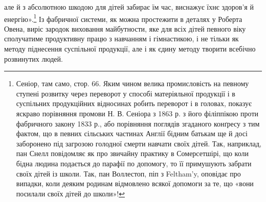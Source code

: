 але й з абсолютною шкодою для дітей забирає їм час, виснажує
їхнє здоров’я й енергію».\footnote{
Сеніор, там само, стор. 66. Яким чином велика промисловість на
певному ступені розвитку через переворот у способі матеріяльної продукції
і в суспільних продукційних відносинах робить переворот і в головах,
показує яскраво порівняння промови Н. В. Сеніора з 1863 р. з його філіппікою
проти фабричного закону 1833 р., або порівняння поглядів згаданого
конґресу з тим фактом, що в певних сільських частинах Англії бідним
батькам ще й досі заборонено під загрозою голодної смерти навчати
своїх дітей. Так, наприклад, пан Снелл повідомляє як про звичайну практику
в Сомерсетшірі, що коли бідна людина подається до парафії
по допомогу, то її примушують забрати своїх дітей із школи. Так, пан
Воллестоп, піп з Feltham’y, оповідає про випадки, коли деяким родинам
відмовлено всякої допомоги за те, що «вони посилали своїх дітей до
школи»!
} Із фабричної системи, як можна простежити
в деталях у Роберта Овена, виріс зародок виховання
майбутности, яке для всіх дітей певного віку сполучатиме продуктивну
працю з навчанням і гімнастикою, і не тільки як методу
піднесення суспільної продукції, але і як єдину методу творити
всебічно розвинутих людей.

